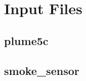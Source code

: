 \documentclass[11pt,twoside]{book}
\newcommand{\fdsinput}[1]{
{
\scriptsize

}
}
\begin{document}
%





\appendix
{}

\chapter{Input Files}
\label{fdsinputfiles}

\section{plume5c}
\label{FDSplume5c}
\fdsinput{plume5c.fds}

\section{smoke\_sensor}
\label{FDSsmokesensor}
\fdsinput{smoke_sensor.fds}
\end{document}
